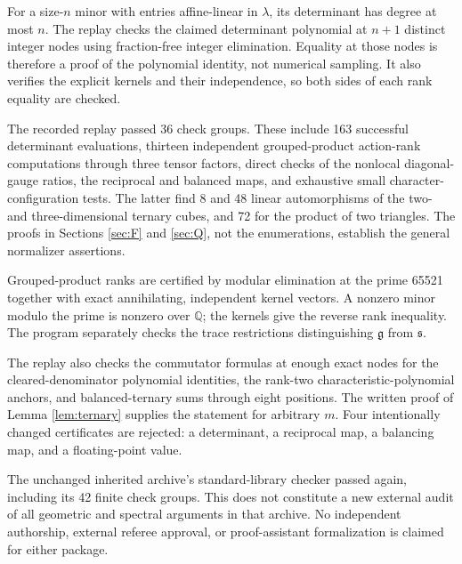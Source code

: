 \documentclass[11pt]{article}
\theoremstyle{remark}\newtheorem{remark}[theorem]{Remark}
\newcommand{\g}{\mathfrak g}
\newcommand{\s}{\mathfrak s}
\begin{document}
For a size-$n$ minor with entries affine-linear in $\lambda$, its determinant has degree at most $n$. The replay checks the claimed determinant polynomial at $n+1$ distinct integer nodes using fraction-free integer elimination. Equality at those nodes is therefore a proof of the polynomial identity, not numerical sampling. It also verifies the explicit kernels and their independence, so both sides of each rank equality are checked.

The recorded replay passed 36 check groups. These include 163 successful determinant evaluations, thirteen independent grouped-product action-rank computations through three tensor factors, direct checks of the nonlocal diagonal-gauge ratios, the reciprocal and balanced maps, and exhaustive small character-configuration tests. The latter find 8 and 48 linear automorphisms of the two- and three-dimensional ternary cubes, and 72 for the product of two triangles. The proofs in Sections \ref{sec:F} and \ref{sec:Q}, not the enumerations, establish the general normalizer assertions.

Grouped-product ranks are certified by modular elimination at the prime 65521 together with exact annihilating, independent kernel vectors. A nonzero minor modulo the prime is nonzero over $\mathbb Q$; the kernels give the reverse rank inequality. The program separately checks the trace restrictions distinguishing $\g$ from $\s$.

The replay also checks the commutator formulas at enough exact nodes for the cleared-denominator polynomial identities, the rank-two characteristic-polynomial anchors, and balanced-ternary sums through eight positions. The written proof of Lemma \ref{lem:ternary} supplies the statement for arbitrary $m$. Four intentionally changed certificates are rejected: a determinant, a reciprocal map, a balancing map, and a floating-point value.

The unchanged inherited archive's standard-library checker passed again, including its 42 finite check groups. This does not constitute a new external audit of all geometric and spectral arguments in that archive. No independent authorship, external referee approval, or proof-assistant formalization is claimed for either package.
\end{document}
